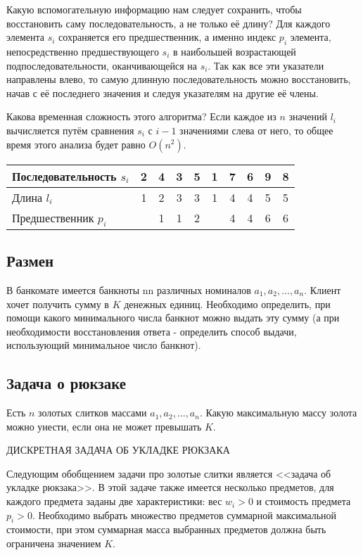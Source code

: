 \documentclass[14pt]{book}
\begin{document}
Какую вспомогательную информацию нам следует сохранить, чтобы восстановить саму
последовательность, а не только её длину? Для каждого элемента $s_i$ сохраняется его
предшественник, а именно индекс $p_i$ элемента, непосредственно предшествующего $s_i$
в наибольшей возрастающей подпоследовательности, оканчивающейся на $s_i$. Так как все
эти указатели направлены влево, то самую длинную последовательность можно восстановить,
начав с её последнего значения и следуя указателям на другие её члены.

Какова временная сложность этого алгоритма? Если каждое из $n$ значений $l_i$ вычисляется
путём сравнения $s_i$ с $i-1$ значениями слева от него, то общее время этого анализа
будет равно $O(n^2)$.

\begin{tabular}{l|c|c|c|c|c|c|c|c|c}
Последовательность $s_i$ & 2 & 4 & 3 & 5 & 1 & 7 & 6 & 9 & 8 \\
\hline
Длина $l_i$              & 1 & 2 & 3 & 3 & 1 & 4 & 4 & 5 & 5 \\
\hline
Предшественник $p_i$     &   & 1 & 1 & 2 &   & 4 & 4 & 6 & 6 \\
\end{tabular}

\subsection{Размен}

В банкомате имеется банкноты nn различных номиналов $a_1, a_2, \ldots, a_n$. Клиент хочет получить сумму в $K$ денежных единиц. Необходимо определить, при помощи какого минимального числа банкнот можно выдать эту сумму (а при необходимости восстановления ответа - определить способ выдачи, использующий минимальное число банкнот).

\subsection{Задача о рюкзаке}

Есть $n$ золотых слитков массами $a_1, a_2, \ldots, a_n$. Какую максимальную массу золота можно унести, если она не может превышать $K$.

ДИСКРЕТНАЯ ЗАДАЧА ОБ УКЛАДКЕ РЮКЗАКА

Следующим обобщением задачи про золотые слитки является <<задача об укладке рюкзака>>. В этой задаче также имеется несколько предметов, для каждого предмета заданы две характеристики: вес $w_i > 0$ и стоимость предмета $p_i > 0$. Необходимо выбрать множество предметов суммарной максимальной стоимости, при этом суммарная масса выбранных предметов должна быть ограничена значением $K$.
\end{document}
